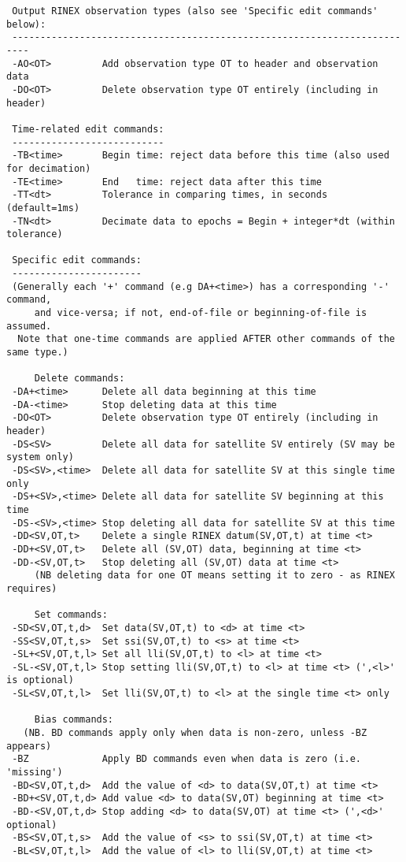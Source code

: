 \begin{\outputsize}
\begin{verbatim}
 Output RINEX observation types (also see 'Specific edit commands' below):
 -------------------------------------------------------------------------
 -AO<OT>         Add observation type OT to header and observation data
 -DO<OT>         Delete observation type OT entirely (including in header)

 Time-related edit commands:
 ---------------------------
 -TB<time>       Begin time: reject data before this time (also used for decimation)
 -TE<time>       End   time: reject data after this time
 -TT<dt>         Tolerance in comparing times, in seconds (default=1ms)
 -TN<dt>         Decimate data to epochs = Begin + integer*dt (within tolerance)

 Specific edit commands:
 -----------------------
 (Generally each '+' command (e.g DA+<time>) has a corresponding '-' command,
     and vice-versa; if not, end-of-file or beginning-of-file is assumed.
  Note that one-time commands are applied AFTER other commands of the same type.)

     Delete commands:
 -DA+<time>      Delete all data beginning at this time
 -DA-<time>      Stop deleting data at this time
 -DO<OT>         Delete observation type OT entirely (including in header)
 -DS<SV>         Delete all data for satellite SV entirely (SV may be system only)
 -DS<SV>,<time>  Delete all data for satellite SV at this single time only
 -DS+<SV>,<time> Delete all data for satellite SV beginning at this time
 -DS-<SV>,<time> Stop deleting all data for satellite SV at this time
 -DD<SV,OT,t>    Delete a single RINEX datum(SV,OT,t) at time <t>
 -DD+<SV,OT,t>   Delete all (SV,OT) data, beginning at time <t>
 -DD-<SV,OT,t>   Stop deleting all (SV,OT) data at time <t>
     (NB deleting data for one OT means setting it to zero - as RINEX requires)

     Set commands:
 -SD<SV,OT,t,d>  Set data(SV,OT,t) to <d> at time <t>
 -SS<SV,OT,t,s>  Set ssi(SV,OT,t) to <s> at time <t>
 -SL+<SV,OT,t,l> Set all lli(SV,OT,t) to <l> at time <t>
 -SL-<SV,OT,t,l> Stop setting lli(SV,OT,t) to <l> at time <t> (',<l>' is optional)
 -SL<SV,OT,t,l>  Set lli(SV,OT,t) to <l> at the single time <t> only

     Bias commands:
   (NB. BD commands apply only when data is non-zero, unless -BZ appears)
 -BZ             Apply BD commands even when data is zero (i.e. 'missing')
 -BD<SV,OT,t,d>  Add the value of <d> to data(SV,OT,t) at time <t>
 -BD+<SV,OT,t,d> Add value <d> to data(SV,OT) beginning at time <t>
 -BD-<SV,OT,t,d> Stop adding <d> to data(SV,OT) at time <t> (',<d>' optional)
 -BS<SV,OT,t,s>  Add the value of <s> to ssi(SV,OT,t) at time <t>
 -BL<SV,OT,t,l>  Add the value of <l> to lli(SV,OT,t) at time <t>
\end{verbatim}
\end{\outputsize}

